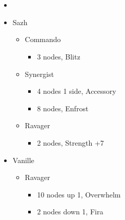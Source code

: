 \chapter[Chapter 8]{}

\begin{paracol}{2}
	\begin{menu}
		\begin{itemize}
			\paradigm
			\begin{itemize}
				\item {}%
				      {\paradigmline[1]{\textit{\com}}{\textit{\rav}}{}}%
				      {\paradigmline{(\com)}{(\med)}{}}%
				      {\paradigmline{\syn}{\sab}{}}%
				      {\paradigmline{\rav}{\rav}{}}%
				      {\paradigmline{\rav}{\sab}{}}%
				      {\paradigmline{\com}{\sab}{}}
			\end{itemize}
			\crystarium
			\begin{itemize}
				\item Sazh
				      \begin{itemize}
					      \item Commando
					            \begin{itemize}
						            \item 3 nodes, Blitz
					            \end{itemize}
					      \item Synergist
					            \begin{itemize}
						            \item 4 nodes 1 side, Accessory
						            \item 8 nodes, Enfrost
					            \end{itemize}
					      \item Ravager
					            \begin{itemize}
						            \item 2 nodes, Strength +7
					            \end{itemize}
				      \end{itemize}
				\item Vanille
				      \begin{itemize}
					      \item Ravager
					            \begin{itemize}
						            \item 10 nodes up 1, Overwhelm
						            \item 2 nodes down 1, Fira
					            \end{itemize}

\end{itemize}
\end{itemize}
\end{itemize}
\end{menu}
\end{paracol}
